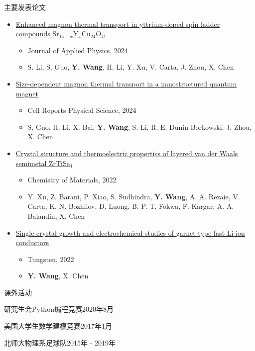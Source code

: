 \documentclass{resume} %
\begin{document}
\begin{rSection}{主要发表论文}
\begin{itemize}
\item \href{https://doi.org/10.1063/5.0214897}{Enhanced magnon thermal transport in yttrium-doped spin ladder compounds Sr$_{14-x}$Y$_x$Cu$_{24}$O$_{41}$}
    \begin{itemize}
        \item Journal of Applied Physics, 2024
        \item S. Li, S. Guo, \textbf{Y. Wang}, H. Li, Y. Xu, V. Carta, J. Zhou, X. Chen
    \end{itemize}

\item \href{https://doi.org/10.1016/j.xcrp.2024.101879}{Size-dependent magnon thermal transport in a nanostructured quantum magnet}
    \begin{itemize}
        \item Cell Reports Physical Science, 2024
        \item S. Guo, H. Li, X. Bai, \textbf{Y. Wang}, S. Li, R. E. Dunin-Borkowski, J. Zhou, X. Chen
    \end{itemize}

\item \href{https://doi.org/10.1021/acs.chemmater.2c02155}{Crystal structure and thermoelectric properties of layered van der Waals semimetal ZrTiSe$_4$}
    \begin{itemize}
        \item Chemistry of Materials, 2022
        \item Y. Xu, Z. Barani, P. Xiao, S. Sudhindra, \textbf{Y. Wang}, A. A. Rezaie, V. Carta, K. N. Bozhilov, D. Luong, B. P. T. Fokwa, F. Kargar, A. A. Balandin, X. Chen
    \end{itemize}

\item \href{https://doi.org/10.1007/s42864-022-00176-z}{Single crystal growth and electrochemical studies of garnet-type fast Li-ion conductors}
    \begin{itemize}
        \item Tungsten, 2022
        \item \textbf{Y. Wang}, X. Chen
    \end{itemize}
\end{itemize}


\end{rSection}


\begin{rSection}{课外活动}
    
    \begin{qSubsection}
        {研究生会Python编程竞赛}{2020年8月}
    \end{qSubsection}

    \begin{qSubsection}
        {美国大学生数学建模竞赛}{2017年1月}
    \end{qSubsection}

    \begin{qSubsection}
        {北师大物理系足球队}{2015年 - 2019年}
    \end{qSubsection}
\end{rSection}

 
\end{document}
